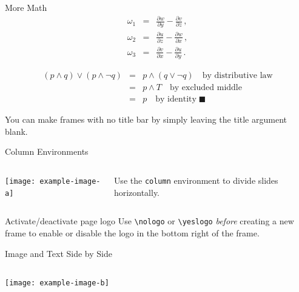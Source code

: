 \documentclass[aspectratio=169]{beamer}
\newcommand{\nologo}{\setbeamertemplate{logo}{}}
\begin{document}
\begin{frame}{More Math}
    \begin{eqnarray}
    	\omega_1 & = &
    	\frac{\partial w}{\partial y}-\frac{\partial v}{\partial z}\,,
    	\nonumber  \\
    	\omega_2 & = & 
    	\frac{\partial u}{\partial z}-\frac{\partial w}{\partial x}\,,
    	\label{eqcurl}  \\
    	\omega_3 & = & 
    	\frac{\partial v}{\partial x}-\frac{\partial u}{\partial y}\,.
    	\nonumber
    \end{eqnarray}
    
    \begin{eqnarray*}
    	(p\wedge q)\vee(p\wedge\neg q) & = & p\wedge(q\vee\neg q)
    	\quad\text{by distributive law}  \\
    	 & = & p\wedge T \quad\text{by excluded middle}  \\
    	 & = & p \quad\text{by identity} \;\blacksquare
    \end{eqnarray*}
    
\end{frame}

\begin{frame}{}
    You can make frames with no title bar by simply leaving the title argument blank.

\end{frame}

\begin{frame}{Column Environments}
    \begin{columns}
        \begin{column}{0.47\textwidth}
            \texttt{[image: example-image-a]}
        \end{column}
        \begin{column}{0.5\textwidth}
            \footnotesize
            Use the \texttt{column} environment to divide slides horizontally.
        \end{column}
    \end{columns}
\end{frame}

\begin{frame}{Activate/deactivate page logo}
	Use \texttt{\textbackslash nologo} or \texttt{\textbackslash yeslogo}
	\emph{before} creating a new frame
	to enable or disable the
	logo in the bottom right of the frame.
\end{frame}

\nologo
\begin{frame}{Image and Text Side by Side}
    \begin{columns}
        \begin{column}{0.47\textwidth}
            \texttt{[image: example-image-b]}
        \end{column}
        \begin{column}{0.5\textwidth}
            \footnotesize
		\lipsum[10]
        \end{column}
    \end{columns}
\end{frame}
\end{document}
